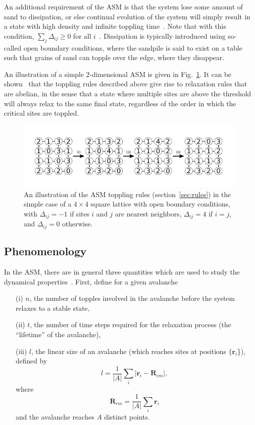 \documentclass[aps,prb,reprint,superscriptaddress]{revtex4-2}
\begin{document}
An additional requirement of the ASM is that the system lose some amount of sand to dissipation, or else continual evolution of the system will simply result in a state with high density and infinite toppling time~\cite{jensen}. Note that with this condition, $\sum_j\Delta_{ij} \geq 0$ for all $i$~\cite{majumdar_equivalence_1992}. Dissipation is typically introduced using so-called open boundary conditions, where the sandpile is said to exist on a table such that grains of sand can topple over the edge, where they disappear.

An illustration of a simple 2-dimensional ASM is given in Fig.~\ref{fig:rules}. It can be shown~\cite{dhar_self-organized_1990} that the toppling rules described above give rise to relaxation rules that are abelian, in the sense that a state where multiple sites are above the threshold will always relax to the same final state, regardless of the order in which the critical sites are toppled.

\begin{figure}
\includegraphics{rules}
\caption{\label{fig:rules} An illustration of the ASM toppling rules (section~\ref{sec:rules}) in the simple case of a $4 \times 4$ square lattice with open boundary conditions, with $\Delta_{ij} = -1$ if sites $i$ and $j$ are nearest neighbors, $\Delta_{ij} = 4$ if $i = j$, and $\Delta_{ij} = 0$ otherwise.}
\end{figure}

\subsection{Phenomenology\label{sec:phenomenology}}

In the ASM, there are in general three quantities which are used to study the dynamical properties~\cite{jensen, otherbook}. First, define for a given avalanche

\begin{enumerate}
\item[(i)] $n$, the number of topples involved in the avalanche before the system relaxes to a stable state,
\item[(ii)] $t$, the number of time steps required for the relaxation process (the ``lifetime'' of the avalanche),
\item[(iii)] $l$, the linear size of an avalanche (which reaches sites at positions $\{\bm{r}_i$\}), defined by
\[
l = \dfrac{1}{|A|}\sum_i|\bm{r}_i-\bm{R}_{cm}|,
\]
where
\[
\bm{R}_{cm} = \dfrac{1}{|A|}\sum_i\bm{r}_i
\]
and the avalanche reaches $A$ distinct points.
\end{enumerate}
\end{document}
